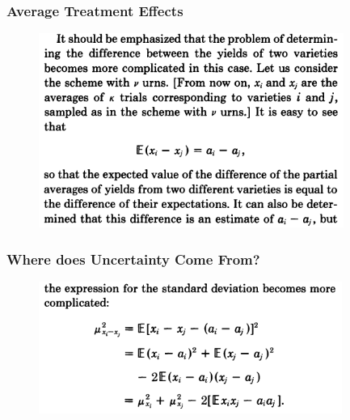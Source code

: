 \documentclass{beamer}
\begin{document}
\begin{frame}[t]\frametitle{Average Treatment Effects}
	\begin{figure}[htbp]
		\centering
			\includegraphics[height=2.5in]{neyman6.png}
		\label{fig:neyman6}
	\end{figure}
\end{frame}

\begin{frame}[t]\frametitle{Where does Uncertainty Come From?}
	\begin{figure}[htbp]
		\centering
			\includegraphics[height=1.7in]{neyman7.png}
		\label{fig:neyman7}
	\end{figure}
\end{frame}
\end{document}
